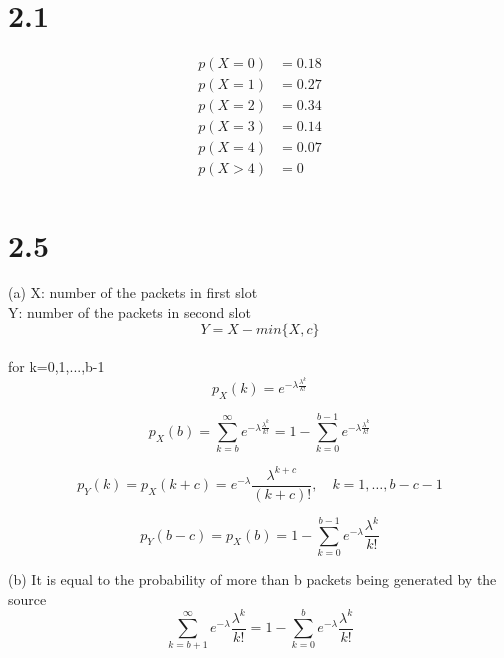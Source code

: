 \documentclass{article}
\begin{document}
	
	
\section*{2.1}
\begin{align}
p(X=0) & = 0.18 \nonumber \\
p(X=1) & = 0.27 \nonumber \\
p(X=2) & = 0.34 \nonumber \\
p(X=3) & = 0.14 \nonumber \\
p(X=4) & = 0.07 \nonumber \\
p(X>4) & = 0 \nonumber \\
\end{align}

\section*{2.5}
(a) X: number of the packets in first slot\\
Y: number of the packets in second slot\\
\begin{equation*}
	Y = X - min \{X,c\}
\end{equation*}
\\ for k=0,1,...,b-1
\begin{equation*}
	p_X(k) = e^{-\lambda \frac{\lambda^k}{k!}}
\end{equation*}

\begin{equation*}
	p_X(b) =  \sum_{k=b} ^{\infty} e^{-\lambda \frac{\lambda^k}{k!}} = 1 -  \sum_{k=0} ^{b-1} e^{-\lambda \frac{\lambda^k}{k!}}
\end{equation*}

\begin{equation*}
	p_{Y}(k)=p_{X}(k+c)=e^{-\lambda} \frac{\lambda^{k+c}}{(k+c) !}, \quad k=1, \ldots, b-c-1
\end{equation*}

\begin{equation*}
p_{Y}(b-c)=p_{X}(b)=1-\sum_{k=0}^{b-1} e^{-\lambda} \frac{\lambda^{k}}{k !}
\end{equation*}


(b) It is equal to the probability of more than b packets being generated by the source
\begin{equation*}
\sum_{k=b+1}^{\infty} e^{-\lambda} \frac{\lambda^{k}}{k !} = 1-\sum_{k=0}^{b} e^{-\lambda} \frac{\lambda^{k}}{k !}
\end{equation*}
\end{document}
